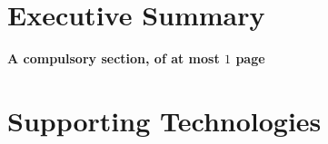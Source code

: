 \documentclass[ %
                    author={Alexander Dalton},
                supervisor={Prof. Seth Bullock},
                    degree={MEng},
                     title={Exploring Evolutionary Hardware:},
                  subtitle={Evolved Binary Arithmetic Circuits and Dynamic Problems},
                      type={research},
                      year={2018} ]{dissertation}
\begin{document}


\maketitle


\frontmatter


\makedecl


\tableofcontents
\listoffigures
\listoftables
\listofalgorithms
\lstlistoflistings



\chapter*{Executive Summary}

{\bf \color{red}A compulsory section, of at most $1$ page} 
\vspace{1cm} 




\chapter*{Supporting Technologies}
\end{document}
